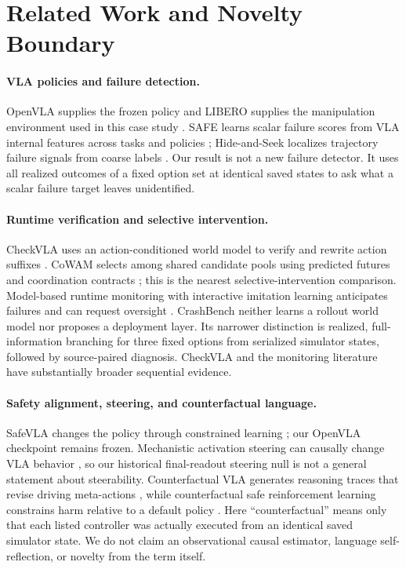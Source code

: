 \documentclass[10pt]{article}
\begin{document}
\section{Related Work and Novelty Boundary}

\paragraph{VLA policies and failure detection.}
OpenVLA supplies the frozen policy and LIBERO supplies the manipulation
environment used in this case study \citep{kim2024openvla,liu2023libero}.
SAFE learns scalar failure scores from VLA internal features across tasks and
policies \citep{gu2025safe}; Hide-and-Seek localizes trajectory failure signals
from coarse labels \citep{park2026hide}. Our result is not a new failure
detector. It uses all realized outcomes of a fixed option set at identical
saved states to ask what a scalar failure target leaves unidentified.

\paragraph{Runtime verification and selective intervention.}
CheckVLA uses an action-conditioned world model to verify and rewrite action
suffixes \citep{liu2026checkvla}. CoWAM selects among shared candidate pools
using predicted futures and coordination contracts \citep{liu2026cowam}; this
is the nearest selective-intervention comparison. Model-based runtime
monitoring with interactive imitation learning anticipates failures and can
request oversight \citep{liu2023runtime}. CrashBench neither learns a rollout
world model nor proposes a deployment layer. Its narrower distinction is
realized, full-information branching for three fixed options from serialized
simulator states, followed by source-paired diagnosis. CheckVLA and the
monitoring literature have substantially broader sequential evidence.

\paragraph{Safety alignment, steering, and counterfactual language.}
SafeVLA changes the policy through constrained learning
\citep{zhang2025safevla}; our OpenVLA checkpoint remains frozen. Mechanistic
activation steering can causally change VLA behavior
\citep{haon2025steering}, so our historical final-readout steering null is not
a general statement about steerability. Counterfactual VLA generates reasoning
traces that revise driving meta-actions \citep{peng2025counterfactualvla}, while
counterfactual safe reinforcement learning constrains harm relative to a
default policy \citep{vaskov2024donoharm}. Here ``counterfactual'' means only
that each listed controller was actually executed from an identical saved
simulator state. We do not claim an observational causal estimator, language
self-reflection, or novelty from the term itself.
\end{document}
